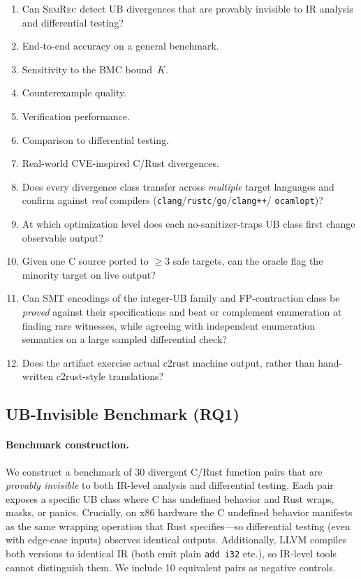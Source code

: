 \documentclass[10pt,a4paper]{article}
\begin{document}
\begin{enumerate}[nosep]
  \item[\textbf{RQ1}] Can \textsc{SemRec} detect UB divergences that
    are provably invisible to IR analysis and differential testing?
  \item[\textbf{RQ2}] End-to-end accuracy on a general benchmark.
  \item[\textbf{RQ3}] Sensitivity to the BMC bound~$K$.
  \item[\textbf{RQ4}] Counterexample quality.
  \item[\textbf{RQ5}] Verification performance.
  \item[\textbf{RQ6}] Comparison to differential testing.
  \item[\textbf{RQ7}] Real-world CVE-inspired C/Rust divergences.
  \item[\textbf{RQ8}] Does every divergence class transfer across
    \emph{multiple} target languages and confirm against \emph{real}
    compilers (\texttt{clang}/\texttt{rustc}/\texttt{go}/\texttt{clang++}/%
    \texttt{ocamlopt})?
  \item[\textbf{RQ9}] At which optimization level does each
    no-sanitizer-traps UB class first change observable output?
  \item[\textbf{RQ10}] Given one C source ported to $\geq 3$ safe targets, can
    the oracle flag the minority target on live output?
  \item[\textbf{RQ11}] Can SMT encodings of the integer-UB family and
    FP-contraction class be \emph{proved} against their specifications and
    beat or complement enumeration at finding rare witnesses, while agreeing
    with independent enumeration semantics on a large sampled differential
    check?
  \item[\textbf{RQ12}] Does the artifact exercise actual c2rust machine output,
    rather than hand-written c2rust-style translations?
\end{enumerate}

\subsection{UB-Invisible Benchmark (RQ1)}\label{sec:eval-ub}

\paragraph{Benchmark construction.}
We construct a benchmark of 30 divergent C/Rust function pairs that are
\emph{provably invisible} to both IR-level analysis and differential
testing.  Each pair exposes a specific UB class where C has undefined
behavior and Rust wraps, masks, or panics.  Crucially, on x86 hardware
the C undefined behavior manifests as the same wrapping operation that
Rust specifies---so differential testing (even with edge-case inputs)
observes identical outputs.  Additionally, LLVM compiles both versions
to identical IR (both emit plain \texttt{add i32} etc.), so IR-level
tools cannot distinguish them.  We include 10 equivalent pairs as
negative controls.
\end{document}
